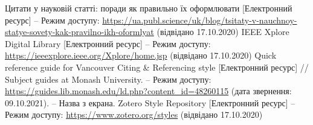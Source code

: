 \documentclass[oneside,14pt,a4paper]{extreport}
\begin{document}
\begingroup
\renewcommand{\section}[2]{}
\renewcommand{\chapter}[2]{}
\begin{thebibliography}{99}
 Цитати у науковій статті: поради як правильно їх оформлювати [Електронний ресурс] – Режим доступу: \url{https://ua.publ.science/uk/blog/tsitaty-v-nauchnoy-statye-sovety-kak-pravilno-ikh-oformlyat} (відвідано 17.10.2020)
 IEEE Xplore Digital Library [Електронний ресурс] – Режим доступу: \url{https://ieeexplore.ieee.org/Xplore/home.jsp} (відвідано 17.10.2020) 
 Quick reference guide for Vancouver Citing \& Referencing style [Електронний ресурс] // Subject guides at Monash University. – Режим доступу: \url{https://guides.lib.monash.edu/ld.php?content\_id=48260115} (дата звернення: 09.10.2021). – Назва з екрана.
 Zotero Style Repository [Електронний ресурс] – Режим доступу: \url{https://www.zotero.org/styles} (відвідано 17.10.2020)
\end{thebibliography}
\end{document}
